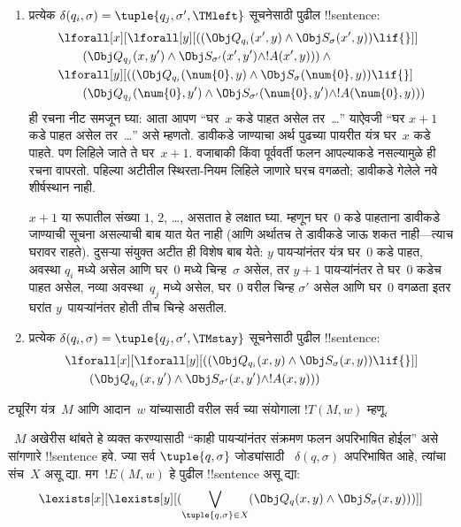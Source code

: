 \documentclass[../../../include/open-logic-section]{subfiles}
\begin{document}
\begin{enumerate}
\begin{enumerate}
\item {} प्रत्येक
  $\delta(q_i, \sigma) =
  \tuple{q_j, \sigma', \TMleft}$
  सूचनेसाठी पुढील !!{sentence}:
\begin{align*}
& \lforall[x][\lforall[y][
    ((\Obj Q_{q_i}(x', y) \land \Obj S_{\sigma}(x', y)) \lif {}]]\\
& \qquad   (\Obj Q_{q_j}(x, y') \land \Obj S_{\sigma'}(x', y') \land
!A(x', y))) \land {}\\
& \lforall[y][((\Obj Q_{q_i}(\num{0}, y) \land \Obj S_{\sigma}(\num{0},
    y)) \lif {}]\\
& \qquad (\Obj Q_{q_j}(\num{0}, y') \land \Obj S_{\sigma'}(\num{0},
  y') \land !A(\num{0}, y)))
\end{align*}
ही रचना नीट समजून घ्या:
आता आपण “घर~$x$ कडे
पाहत असेल तर~\dots”
याऐवजी “घर $x+1$
कडे पाहत असेल तर~\dots”
असे म्हणतो. डावीकडे
जाण्याचा अर्थ पुढच्या
पायरीत यंत्र घर~$x$
कडे पाहते. पण लिहिले
जाते ते घर~$x+1$.
वजाबाकी किंवा पूर्ववर्ती
फलन आपल्याकडे नसल्यामुळे
ही रचना वापरतो.
पहिल्या अटीतील स्थिरता-नियम
लिहिले जाणारे घरच
वगळतो; डावीकडे गेलेले
नवे शीर्षस्थान नाही.
%

$x+1$ या रूपातील संख्या
$1$, $2$, \dots,
असतात हे लक्षात घ्या.
म्हणून घर~$0$ कडे पाहताना
डावीकडे जाण्याची सूचना
असल्याची बाब यात येत
नाही (आणि अर्थातच ते
डावीकडे जाऊ शकत नाही---त्याच
घरावर राहते). दुसऱ्या
संयुक्त अटीत ही विशेष
बाब येते: $y$ पायऱ्यांनंतर
यंत्र घर~$0$ कडे पाहत,
अवस्था $q_i$ मध्ये असेल
आणि घर~$0$ मध्ये
चिन्ह~$\sigma$ असेल, तर
$y+1$ पायऱ्यांनंतर ते
घर~$0$ कडेच पाहत असेल,
नव्या अवस्था~$q_j$ मध्ये
असेल, घर~$0$ वरील
चिन्ह $\sigma'$ असेल
आणि घर~$0$ वगळता
इतर घरांत $y$~पायऱ्यांनंतर
होती तीच चिन्हे असतील.
\item {} प्रत्येक
  $\delta(q_i, \sigma) =
  \tuple{q_j, \sigma', \TMstay}$
  सूचनेसाठी पुढील !!{sentence}:
\begin{align*}
& \lforall[x][\lforall[y][(
   (\Obj Q_{q_i}(x, y) \land \Obj S_{\sigma}(x, y)) \lif {}]] \\
&\qquad   (\Obj Q_{q_j}(x, y') \land \Obj S_{\sigma'}(x, y') \land
!A(x, y)))
\end{align*}
\end{enumerate}
\end{enumerate}
ट्यूरिंग यंत्र~$M$ आणि आदान~$w$
यांच्यासाठी वरील सर्व च्या संयोगाला $!T(M, w)$ म्हणू.

~$M$ अखेरीस थांबते हे व्यक्त
करण्यासाठी “काही पायऱ्यांनंतर
संक्रमण फलन अपरिभाषित होईल”
असे सांगणारे !!{sentence} हवे. ज्या सर्व
$\tuple{q, \sigma}$ जोड्यांसाठी
~$\delta(q, \sigma)$ अपरिभाषित
आहे, त्यांचा संच~$X$
असू द्या. मग~$!E(M, w)$
हे पुढील !!{sentence}
असू द्या:
\[
\lexists[x][\lexists[y][(\bigvee_{\tuple{q, \sigma} \in
      X}(\Obj Q_q(x, y) \land \Obj S_\sigma(x, y)))]]
\]
\end{document}
